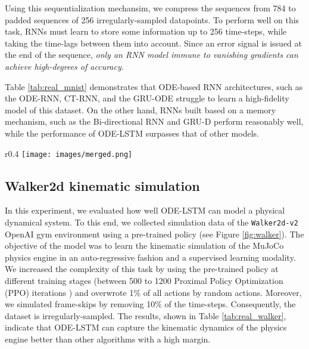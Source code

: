 \documentclass{article}
\begin{document}
Using this sequentialization mechansim, we compress the sequences from 784 to padded sequences of 256 irregularly-sampled datapoints.
To perform well on this task, RNNs must learn to store some information up to 256 time-steps, while taking the time-lags between them into account. Since an error signal is issued at the end of the sequence, \textit{only an RNN model immune to vanishing gradients can achieve high-degrees of accuracy}.




Table \ref{tab:real_mnist} demonstrates that ODE-based RNN architectures, such as the ODE-RNN, CT-RNN, and the GRU-ODE \cite{de2019gru} struggle to learn a high-fidelity model of this dataset. On the other hand, RNNs built based on a memory mechanism, such as the Bi-directional RNN and GRU-D \cite{che2018recurrent} perform reasonably well, while the performance of ODE-LSTM surpasses that of other models.


\begin{wrapfigure}[8]{r}{0.4\textwidth}
\vspace{-5mm}
\centering
\texttt{[image: images/merged.png]}
\vspace{-5mm}
\caption{Walker-2d kinematic dataset}
\label{fig:walker}
\end{wrapfigure}

\subsection{Walker2d kinematic simulation}
In this experiment, we evaluated how well ODE-LSTM can model a physical dynamical system. To this end, we collected simulation data of the \texttt{Walker2d-v2} OpenAI gym \cite{gym} environment using a  pre-trained policy (see Figure \ref{fig:walker}). The objective of the model was to learn the kinematic simulation of the MuJoCo physics engine \cite{todorov2012mujoco} in an auto-regressive fashion and a supervised learning modality.
We increased the complexity of this task by using the pre-trained policy at different training stages (between 500 to 1200 Proximal Policy Optimization (PPO) iterations \cite{schulman2017proximal}) and overwrote 1\% of all actions by random actions.
Moreover, we simulated frame-skips by removing 10\% of the time-steps. Consequently, the dataset is irregularly-sampled. The results, shown in Table \ref{tab:real_walker}, indicate that ODE-LSTM can capture the kinematic dynamics of the physics engine better than other algorithms with a high margin.
\end{document}
